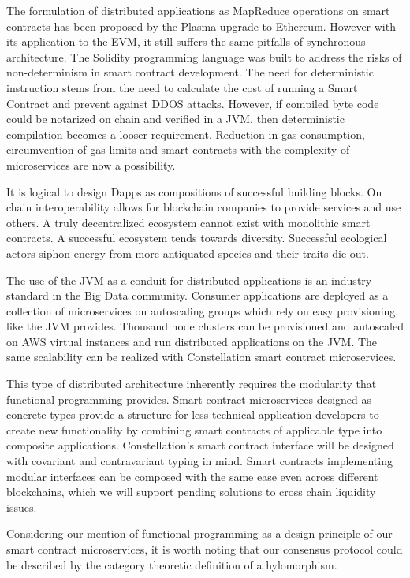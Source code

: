 \documentclass{article}
\begin{document}
The formulation of distributed applications as MapReduce operations on smart contracts has been proposed by the Plasma upgrade to Ethereum. However with its application to the EVM, it still suffers the same pitfalls of synchronous architecture. The Solidity programming language was built to address the risks of non-determinism in smart contract development. The need for deterministic instruction stems from the need to calculate the cost of running a Smart Contract and prevent against DDOS attacks. However, if compiled byte code could be notarized on chain and verified in a JVM, then deterministic compilation becomes a looser requirement. Reduction in gas consumption, circumvention of gas limits and smart contracts with the complexity of microservices are now a possibility.

It is logical to design Dapps as compositions of successful building blocks. On chain interoperability allows for blockchain companies to provide services and use others. A truly decentralized ecosystem cannot exist with monolithic smart contracts. A successful ecosystem tends towards diversity. Successful ecological actors siphon energy from more antiquated species and their traits die out. 

The use of the JVM as a conduit for distributed applications is an industry standard in the Big Data community. Consumer applications are deployed as a collection of microservices on autoscaling groups which rely on easy provisioning, like the JVM provides. Thousand node clusters can be provisioned and autoscaled on AWS virtual instances and run distributed applications on the JVM. The same scalability can be realized with Constellation smart contract microservices. 

This type of distributed architecture inherently requires the modularity that functional programming provides. Smart contract microservices designed as concrete types provide a structure for less technical application developers to create new functionality by combining smart contracts of applicable type into composite applications. Constellation's smart contract interface will be designed with covariant and contravariant typing in mind. Smart contracts implementing modular interfaces can be composed with the same ease even across different blockchains, which we will support pending solutions to cross chain liquidity issues.

Considering our mention of functional programming as a design principle of our smart contract microservices, it is worth noting that our consensus protocol could be described by the category theoretic definition of a hylomorphism.
\end{document}
